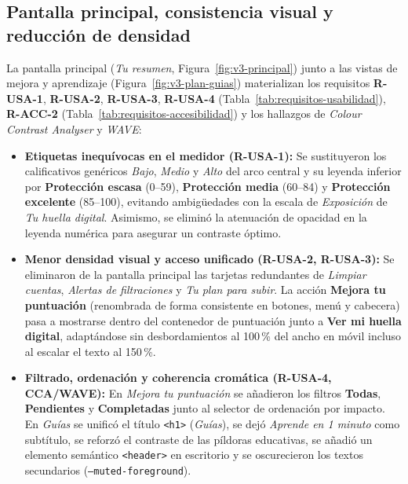 \subsection{Pantalla principal, consistencia visual y reducción de densidad}

La pantalla principal (\textit{Tu resumen}, Figura~\ref{fig:v3-principal}) junto a las vistas de mejora y aprendizaje (Figura~\ref{fig:v3-plan-guias}) materializan los requisitos \textbf{R-USA-1}, \textbf{R-USA-2}, \textbf{R-USA-3}, \textbf{R-USA-4} (Tabla~\ref{tab:requisitos-usabilidad}), \textbf{R-ACC-2} (Tabla~\ref{tab:requisitos-accesibilidad}) y los hallazgos de \textit{Colour Contrast Analyser} y \textit{WAVE}:

\begin{itemize}
  \item \textbf{Etiquetas inequívocas en el medidor (R-USA-1):} Se sustituyeron los calificativos genéricos \textit{Bajo}, \textit{Medio} y \textit{Alto} del arco central y su leyenda inferior por \textbf{Protección escasa} (0--59), \textbf{Protección media} (60--84) y \textbf{Protección excelente} (85--100), evitando ambigüedades con la escala de \textit{Exposición} de \textit{Tu huella digital}. Asimismo, se eliminó la atenuación de opacidad en la leyenda numérica para asegurar un contraste óptimo.
  \item \textbf{Menor densidad visual y acceso unificado (R-USA-2, R-USA-3):} Se eliminaron de la pantalla principal las tarjetas redundantes de \textit{Limpiar cuentas}, \textit{Alertas de filtraciones} y \textit{Tu plan para subir}. La acción \textbf{Mejora tu puntuación} (renombrada de forma consistente en botones, menú y cabecera) pasa a mostrarse dentro del contenedor de puntuación junto a \textbf{Ver mi huella digital}, adaptándose sin desbordamientos al 100\,\% del ancho en móvil incluso al escalar el texto al 150\,\%.
  \item \textbf{Filtrado, ordenación y coherencia cromática (R-USA-4, CCA/WAVE):} En \textit{Mejora tu puntuación} se añadieron los filtros \textbf{Todas}, \textbf{Pendientes} y \textbf{Completadas} junto al selector de ordenación por impacto. En \textit{Guías} se unificó el título \texttt{<h1>} (\textit{Guías}), se dejó \textit{Aprende en 1 minuto} como subtítulo, se reforzó el contraste de las píldoras educativas, se añadió un elemento semántico \texttt{<header>} en escritorio y se oscurecieron los textos secundarios (\texttt{--muted-foreground}).
\end{itemize}

